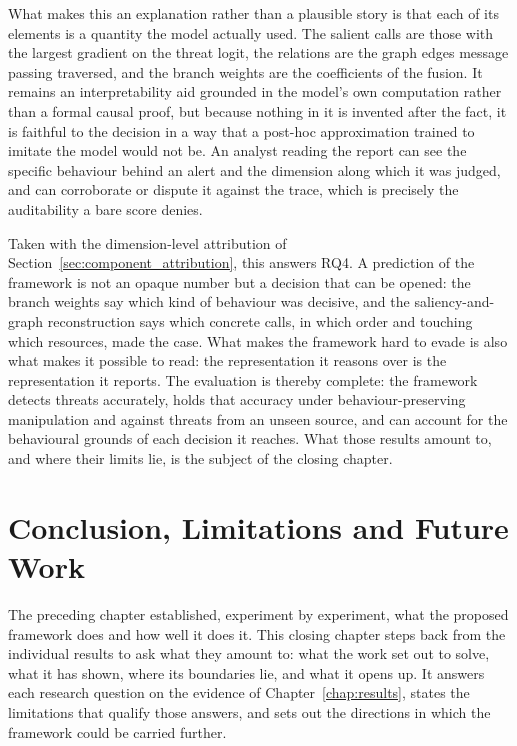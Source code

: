 \documentclass[%
    BCOR=10mm,
    DIV=13,
    toc=bibliography,
    toc=listof,
    oneside,
    12pt,
]{scrbook}
\begin{document}
What makes this an explanation rather than a plausible story is that each of its
elements is a quantity the model actually used. The salient calls are those with
the largest gradient on the threat logit, the relations are the graph edges message
passing traversed, and the branch weights are the coefficients of the fusion. It
remains an interpretability aid grounded in the model's own computation rather than
a formal causal proof, but because nothing in it is invented after the fact, it is
faithful to the decision in a way that a post-hoc approximation trained to imitate
the model would not be. An analyst reading the report can see the specific behaviour
behind an alert and the dimension along which it was judged, and can corroborate or
dispute it against the trace, which is precisely the auditability a bare score
denies.

Taken with the dimension-level attribution of
Section~\ref{sec:component_attribution}, this answers RQ4. A prediction of the
framework is not an opaque number but a decision that can be opened: the branch
weights say which kind of behaviour was decisive, and the saliency-and-graph
reconstruction says which concrete calls, in which order and touching which
resources, made the case. What makes the framework hard to evade is also what
makes it possible to read: the representation it reasons over is the
representation it reports. The evaluation is thereby complete: the framework detects threats
accurately, holds that accuracy under behaviour-preserving manipulation and against
threats from an unseen source, and can account for the behavioural grounds of each
decision it reaches. What those results amount to, and where their limits lie,
is the subject of the closing chapter.

\chapter{Conclusion, Limitations and Future Work}
\label{chap:future_work}

The preceding chapter established, experiment by experiment, what the proposed
framework does and how well it does it. This closing chapter steps back from the
individual results to ask what they amount to: what the work set out to solve, what
it has shown, where its boundaries lie, and what it opens up. It answers each
research question on the evidence of Chapter~\ref{chap:results}, states the
limitations that qualify those answers, and sets out the directions in which the
framework could be carried further.
\end{document}
